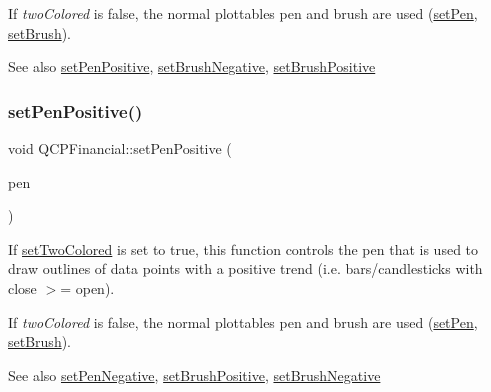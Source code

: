 If {\itshape two\+Colored} is false, the normal plottable\textquotesingle{}s pen and brush are used (\mbox{\hyperlink{class_q_c_p_abstract_plottable_ab74b09ae4c0e7e13142fe4b5bf46cac7}{set\+Pen}}, \mbox{\hyperlink{class_q_c_p_abstract_plottable_a7a4b92144dca6453a1f0f210e27edc74}{set\+Brush}}).

\begin{DoxySeeAlso}{See also}
\mbox{\hyperlink{class_q_c_p_financial_ac58aa3adc7a35aab0088764b840683e5}{set\+Pen\+Positive}}, \mbox{\hyperlink{class_q_c_p_financial_a8bbdd87629f9144b3ef51af660c0961a}{set\+Brush\+Negative}}, \mbox{\hyperlink{class_q_c_p_financial_a5ebff2b1764efd07cc44942e67821829}{set\+Brush\+Positive}} 
\end{DoxySeeAlso}
\mbox{\label{class_q_c_p_financial_ac58aa3adc7a35aab0088764b840683e5}} 
\subsubsection{\texorpdfstring{set\+Pen\+Positive()}{setPenPositive()}}
{\footnotesize\ttfamily void Q\+C\+P\+Financial\+::set\+Pen\+Positive (\begin{DoxyParamCaption}\item[{const Q\+Pen \&}]{pen }\end{DoxyParamCaption})}

If \mbox{\hyperlink{class_q_c_p_financial_a138e44aac160a17a9676652e240c5f08}{set\+Two\+Colored}} is set to true, this function controls the pen that is used to draw outlines of data points with a positive trend (i.\+e. bars/candlesticks with close $>$= open).

If {\itshape two\+Colored} is false, the normal plottable\textquotesingle{}s pen and brush are used (\mbox{\hyperlink{class_q_c_p_abstract_plottable_ab74b09ae4c0e7e13142fe4b5bf46cac7}{set\+Pen}}, \mbox{\hyperlink{class_q_c_p_abstract_plottable_a7a4b92144dca6453a1f0f210e27edc74}{set\+Brush}}).

\begin{DoxySeeAlso}{See also}
\mbox{\hyperlink{class_q_c_p_financial_afe5c07e94ccea01a75b3a2476993c346}{set\+Pen\+Negative}}, \mbox{\hyperlink{class_q_c_p_financial_a5ebff2b1764efd07cc44942e67821829}{set\+Brush\+Positive}}, \mbox{\hyperlink{class_q_c_p_financial_a8bbdd87629f9144b3ef51af660c0961a}{set\+Brush\+Negative}} 
\end{DoxySeeAlso}
\mbox{\label{class_q_c_p_financial_a138e44aac160a17a9676652e240c5f08}} 
